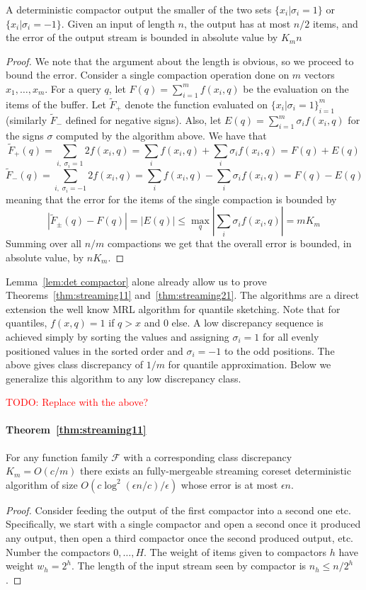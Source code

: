 \documentclass[anon,12pt]{colt2019} %
\newcommand{\todo}[1]{\textcolor{red}{TODO: #1}}
\newcommand{\eps}{\epsilon}
\newcommand{\F}{\mathcal{F}}
\begin{document}
{\begin{lemma} \label{lem:det compactor}
A deterministic compactor output the smaller of the two sets  $\{ x_i | \sigma_i = 1\}$ or  $\{ x_i | \sigma_i = -1\}$. Given an input of length $n$, the output has at most $n/2$ items, and the error of the output stream is bounded in absolute value by $K_m n$
\end{lemma}
\begin{proof}
We note that the argument about the length is obvious, so we proceed to bound the error. Consider a single compaction operation done on $m$ vectors $x_1,\ldots,x_m$. For a query $q$, let $F(q)=\sum_{i=1}^m f(x_i,q)$ be the evaluation on the items of the buffer. Let $\tilde F_{+}$ denote the function evaluated on $\{ x_i | \sigma_i = 1\}_{i=1}^m$ (similarly $\tilde F_{-}$ defined for negative signs). Also, let $E(q) = \sum_{i=1}^m \sigma_i f(x_i,q)$ for the signs $\sigma$ computed by the algorithm above. We have that 
$$\tilde F_{+}(q) = \sum_{i ,\; \sigma_i=1} 2f(x_i, q) = \sum_{i} f(x_i, q) +  \sum_{i} \sigma_i f(x_i, q) = F(q) + E(q)$$
$$\tilde F_{-}(q) = \sum_{i ,\; \sigma_i=-1} 2f(x_i, q) = \sum_{i} f(x_i, q) - \sum_{i} \sigma_i f(x_i, q) = F(q) - E(q)$$
meaning that the error for the items of the single compaction is bounded by
$$|\tilde F_{\pm}(q) - F(q)| = |E(q)| \le \max_q |\sum_i \sigma_i f(x_i,q)| = mK_m$$
Summing over all $n/m$ compactions we get that the overall error is bounded, in absolute value, by $nK_m$.
\end{proof}

Lemma~\ref{lem:det compactor} alone already allow us to prove Theorems~\ref{thm:streaming11} and~\ref{thm:streaming21}. 
The algorithms are a direct extension the well know MRL algorithm \cite{MRL} for quantile sketching. 
Note that for quantiles, $f(x,q) = 1$ if $q > x$ and $0$ else. 
A low discrepancy sequence is achieved simply by sorting the values and assigning $\sigma_i = 1$ for all evenly positioned values in the sorted order and $\sigma_i=-1$ to the odd positions. The above gives class discrepancy of $1/m$ for quantile approximation.
Below we generalize this algorithm to any low discrepancy class.

\todo{Replace with the above?}
\paragraph{Theorem~\ref{thm:streaming11}}
For any function family $\F$ with a corresponding class discrepancy $K_m = O(c/m)$ there exists an fully-mergeable streaming coreset deterministic algorithm of size $O\left(c\log^2(\eps n/c)/\eps\right)$ whose error is at most $\eps n$.
\begin{proof}
Consider feeding the output of the first compactor into a second one etc. Specifically, we start with a single compactor and open a second once it produced any output, then open a third compactor once the second produced output, etc.
Number the compactors $0,\ldots,H$. The weight of items given to compactors $h$ have weight $w_h = 2^h$. The length of the input stream seen by compactor is $n_h \le n/2^h$.


\end{proof}}
\end{document}

